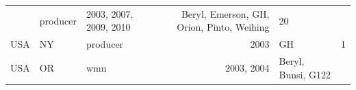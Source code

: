 \begin{longtable}[]{@{}lllrlr@{}}
\begin{minipage}[t]{0.08\columnwidth}
\strut
\end{minipage} & \begin{minipage}[t]{0.12\columnwidth}\raggedright\strut
producer\strut
\end{minipage} & \begin{minipage}[t]{0.19\columnwidth}\raggedleft\strut
2003, 2007, 2009, 2010\strut
\end{minipage} & \begin{minipage}[t]{0.29\columnwidth}\raggedright\strut
Beryl, Emerson, GH, Orion, Pinto, Weihing\strut
\end{minipage} & \begin{minipage}[t]{0.04\columnwidth}\raggedleft\strut
20\strut
\end{minipage}\tabularnewline
\begin{minipage}[t]{0.11\columnwidth}\raggedright\strut
USA\strut
\end{minipage} & \begin{minipage}[t]{0.08\columnwidth}\raggedright\strut
NY\strut
\end{minipage} & \begin{minipage}[t]{0.12\columnwidth}\raggedright\strut
producer\strut
\end{minipage} & \begin{minipage}[t]{0.19\columnwidth}\raggedleft\strut
2003\strut
\end{minipage} & \begin{minipage}[t]{0.29\columnwidth}\raggedright\strut
GH\strut
\end{minipage} & \begin{minipage}[t]{0.04\columnwidth}\raggedleft\strut
1\strut
\end{minipage}\tabularnewline
\begin{minipage}[t]{0.11\columnwidth}\raggedright\strut
USA\strut
\end{minipage} & \begin{minipage}[t]{0.08\columnwidth}\raggedright\strut
OR\strut
\end{minipage} & \begin{minipage}[t]{0.12\columnwidth}\raggedright\strut
wmn\strut
\end{minipage} & \begin{minipage}[t]{0.19\columnwidth}\raggedleft\strut
2003, 2004\strut
\end{minipage} & \begin{minipage}[t]{0.29\columnwidth}\raggedright\strut
Beryl, Bunsi, G122\strut
\end{minipage} & \begin{minipage}[t]{0.04\columnwidth}\raggedleft\strut

\end{minipage}
\end{longtable}

